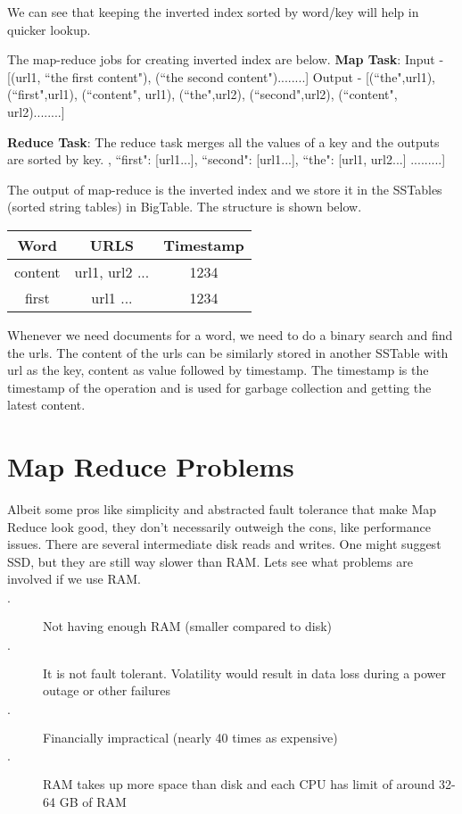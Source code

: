 \documentclass[twoside]{article}
\begin{document}
We can see that keeping the inverted index sorted by word/key will help in quicker lookup.

The map-reduce jobs for creating inverted index are below. \newline
\textbf{Map Task}: Input - [(url1, ``the first content"), (``the second content")........] \newline
Output - [(``the",url1), (``first",url1), (``content", url1), (``the",url2), (``second",url2), (``content", url2)........]

\textbf{Reduce Task}: The reduce task merges all the values of a key and the outputs are sorted by key. \newline
[``content": [url1,url2...], ``first": [url1...], ``second": [url1...], ``the": [url1, url2...] .........]

The output of map-reduce is the inverted index and we store it in the SSTables (sorted string tables) in BigTable. The structure is shown below.

\begin{table}[h!]
\centering
\begin{tabular}{ c|c|c } 
Word & URLS & Timestamp\\
\hline
content & url1, url2 ... & 1234\\
first & url1 ... & 1234\\
\end{tabular}
\end{table}
Whenever we need documents for a word, we need to do a binary search and find the urls. The content of the urls can be similarly stored in another SSTable with url as the key, content as value followed by timestamp.
The timestamp is the timestamp of the operation and is used for garbage collection and getting the latest content.


\section{Map Reduce Problems}
Albeit some pros like simplicity and abstracted fault tolerance that make Map Reduce look good, they don't necessarily outweigh the cons, like performance issues. There are several intermediate disk reads and writes. One might suggest SSD, but they are still way slower than RAM. Lets see what problems are involved if we use RAM.
\begin{description}
\item[$\cdot$ ] Not having enough RAM (smaller compared to disk)
\item[$\cdot$ ] It is not fault tolerant. Volatility would result in data loss during a power outage or other failures
\item[$\cdot$ ] Financially impractical (nearly 40 times as expensive)
\item[$\cdot$ ] RAM takes up more space than disk and each CPU has limit of around 32-64 GB of RAM 
\end{description}
\end{document}
